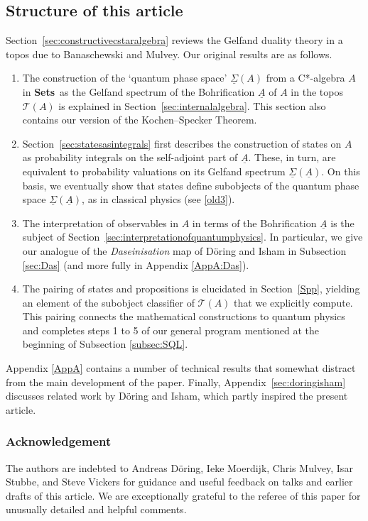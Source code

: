 \documentclass[12pt]{article}
\newcommand{\Sets}{\mbox{\textbf{Sets}}}
\newcommand{\er}{\eqref}
\newcommand{\alg}[1]{\ensuremath{#1}}
\newcommand{\functor}[1]{\ensuremath{\underline{#1}}}
\newcommand{\asstopos}{\ensuremath{\mathcal{T}}}
\newcommand{\uA}{\underline{A}}
\newcommand{\TA}{\mathcal{T}(A)}
\newcommand{\ulS}{\functor{\Sigma}}
\renewcommand{\TA}{\asstopos(\alg{A})}
\begin{document}
\subsection{Structure of this article}\label{mainresults}
Section~\ref{sec:constructivecstaralgebra} reviews the Gelfand
duality theory in a topos due to Banaschewski and Mulvey.
Our original results are as follows.
\begin{enumerate}
\item The  construction of
the `quantum phase space' $\ulS(A)$ from
a C*-algebra $A$ in \Sets\
as the Gelfand spectrum of the Bohrification $\uA$ of $A$ in the topos $\TA$
 is explained in Section~\ref{sec:internalalgebra}. This section also contains
our version of the Kochen--Specker Theorem.
\item Section~\ref{sec:statesasintegrals} first describes
the construction of states on $A$ as probability integrals on the self-adjoint
part of $\uA$. These, in turn, are equivalent to probability valuations on its
Gelfand spectrum
 $\ulS(\uA)$. On this basis, we eventually show that states define subobjects of
the quantum phase space  $\ulS(\uA)$, as in classical physics (see \er{old3}).
\item  The interpretation of observables in $A$ in terms of the
  Bohrification $\uA$ is the subject of
  Section~\ref{sec:interpretationofquantumphysics}. In particular, we
  give our analogue of the {\it Daseinisation} map of D{\"o}ring and
  Isham in Subsection \ref{sec:Das} (and more fully in Appendix \ref{AppA:Das}).
\item The pairing of states and propositions is elucidated in Section~\ref{Spp},
yielding an
element of the subobject classifier of $\TA$ that we explicitly compute. This
pairing  connects the
mathematical constructions to  quantum physics and completes steps 1 to 5 of our
general program mentioned at the beginning of Subsection \ref{subsec:SQL}.
\end{enumerate}
Appendix \ref{AppA} contains a number of technical results that somewhat
distract from the main development of the paper. Finally,
Appendix~\ref{sec:doringisham} discusses related work by
D{\"o}ring and Isham, which partly inspired the present article.
\subsubsection*{Acknowledgement}
The authors are
indebted to Andreas D{\"o}ring, Ieke Moerdijk,  Chris Mulvey, Isar Stubbe, and
Steve Vickers for guidance and
useful feedback on talks and earlier drafts of this article. We are exceptionally
grateful to the referee of this paper for unusually detailed and helpful
comments.
\end{document}
